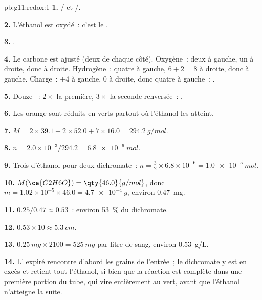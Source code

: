 \begin{solution}{pb:g11:redox:1}
\textbf{1.} / et /.

\textbf{2.} L'éthanol est oxydé~: c'est le .

\textbf{3.} .

\textbf{4.} Le carbone est ajusté (deux de chaque côté). Oxygène~: deux à
gauche, un à droite, donc  à droite. Hydrogène~: quatre à
gauche, $6 + 2 = 8$ à droite, donc  à gauche. Charge~: $+4$ à
gauche, 0 à droite, donc quatre  à gauche~:
.

\textbf{5.} Douze ~: $2\times$ la première, $3\times$ la seconde
renversée~:
.

\textbf{6.} Les   orange sont réduits en 
 verts partout où l'éthanol les atteint.

\textbf{7.} $M = 2\times 39.1 + 2\times 52.0 + 7\times 16.0 =
\qty{294.2}{g/mol}$.

\textbf{8.} $n = 2.0\times 10^{-3}/294.2 = \qty{6.8e-6}{mol}$.

\textbf{9.} Trois  d'éthanol pour deux  dichromate~:
$n = \tfrac{3}{2}\times 6.8\times 10^{-6} = \qty{1.0e-5}{mol}$.

\textbf{10.} $M(\ce{C2H6O}) = \qty{46.0}{g/mol}$, donc
$m = 1.02\times 10^{-5}\times 46.0 = \qty{4.7e-4}{g}$, environ
\qty{0.47}{mg}.

\textbf{11.} $0.25/0.47 \approx 0.53$~: environ \qty{53}{\percent} du
dichromate.

\textbf{12.} $0.53 \times 10 \approx \qty{5.3}{cm}$.

\textbf{13.} $\qty{0.25}{mg} \times 2100 = \qty{525}{mg}$ par litre de
sang, environ \qty{0.53}{g/L}.

\textbf{14.} L' expiré rencontre d'abord les grains de l'entrée~; le
dichromate y est en excès et retient tout l'éthanol, si bien que la
réaction est complète dans une première portion du tube, qui vire
entièrement au vert, avant que l'éthanol n'atteigne la suite.


\end{solution}
